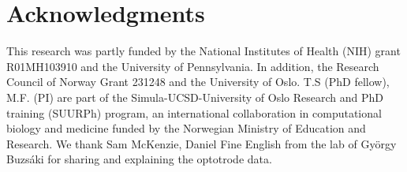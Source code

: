 \documentclass[11pt]{article}
\begin{document}
\FloatBarrier
\section{Acknowledgments}
This research was partly funded by the National Institutes of Health (NIH) grant  R01MH103910 and the University of Pennsylvania.
In addition, the Research Council of Norway Grant 231248 and the University of Oslo.
T.S (PhD fellow), M.F. (PI) are part of the Simula-UCSD-University of Oslo Research
and PhD training (SUURPh) program, an international collaboration in computational biology and medicine funded by the Norwegian Ministry of Education and Research.
We thank Sam McKenzie, Daniel Fine English from the lab of György Buzsáki for sharing and explaining the optotrode data.
\pagestyle{empty}

{\footnotesize\linespread{1}
}
\end{document}
